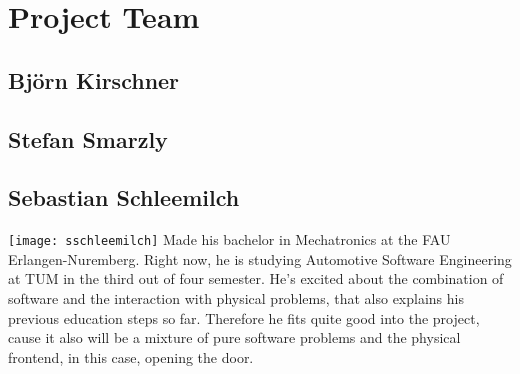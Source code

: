 \section{Project Team}\label{sec:team}

\subsection{Björn Kirschner}
\subsection{Stefan Smarzly}
\subsection{Sebastian Schleemilch}
\texttt{[image: sschleemilch]}
Made his bachelor in Mechatronics at the FAU Erlangen-Nuremberg. Right now, he is studying Automotive Software Engineering at TUM in the third out of four semester. He's excited about the combination of software and the interaction with physical problems, that also explains his previous education steps so far. Therefore he fits quite good into the project, cause it also will be a mixture of pure software problems and the physical frontend, in this case, opening the door.